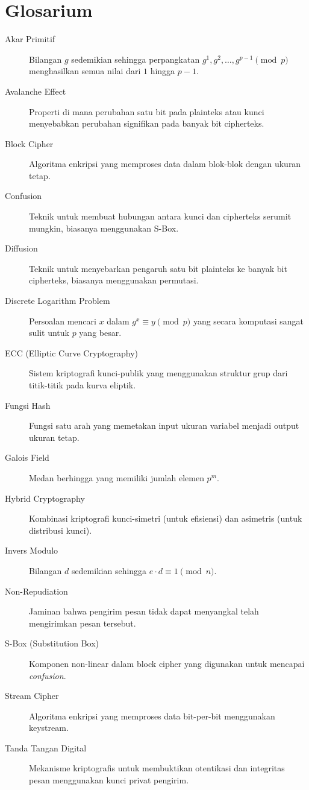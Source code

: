 \documentclass[../main.tex]{subfiles}
\begin{document}
\chapter*{Glosarium}

\begin{description}
    \item[Akar Primitif] Bilangan $g$ sedemikian sehingga perpangkatan $g^1, g^2, \dots, g^{p-1} \pmod{p}$ menghasilkan semua nilai dari $1$ hingga $p-1$.
    \item[Avalanche Effect] Properti di mana perubahan satu bit pada plainteks atau kunci menyebabkan perubahan signifikan pada banyak bit cipherteks.
    \item[Block Cipher] Algoritma enkripsi yang memproses data dalam blok-blok dengan ukuran tetap.
    \item[Confusion] Teknik untuk membuat hubungan antara kunci dan cipherteks serumit mungkin, biasanya menggunakan S-Box.
    \item[Diffusion] Teknik untuk menyebarkan pengaruh satu bit plainteks ke banyak bit cipherteks, biasanya menggunakan permutasi.
    \item[Discrete Logarithm Problem] Persoalan mencari $x$ dalam $g^x \equiv y \pmod{p}$ yang secara komputasi sangat sulit untuk $p$ yang besar.
    \item[ECC (Elliptic Curve Cryptography)] Sistem kriptografi kunci-publik yang menggunakan struktur grup dari titik-titik pada kurva eliptik.
    \item[Fungsi Hash] Fungsi satu arah yang memetakan input ukuran variabel menjadi output ukuran tetap.
    \item[Galois Field] Medan berhingga yang memiliki jumlah elemen $p^m$.
    \item[Hybrid Cryptography] Kombinasi kriptografi kunci-simetri (untuk efisiensi) dan asimetris (untuk distribusi kunci).
    \item[Invers Modulo] Bilangan $d$ sedemikian sehingga $e \cdot d \equiv 1 \pmod{n}$.
    \item[Non-Repudiation] Jaminan bahwa pengirim pesan tidak dapat menyangkal telah mengirimkan pesan tersebut.
    \item[S-Box (Substitution Box)] Komponen non-linear dalam block cipher yang digunakan untuk mencapai \textit{confusion}.
    \item[Stream Cipher] Algoritma enkripsi yang memproses data bit-per-bit menggunakan keystream.
    \item[Tanda Tangan Digital] Mekanisme kriptografis untuk membuktikan otentikasi dan integritas pesan menggunakan kunci privat pengirim.
\end{description}
\end{document}
